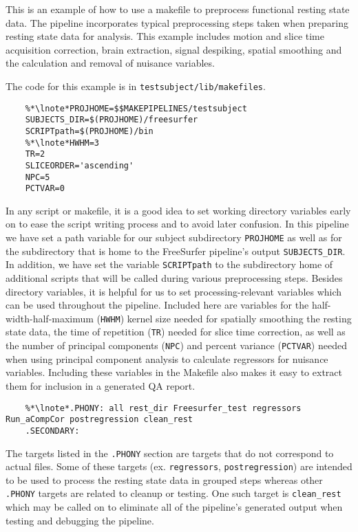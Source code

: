 \label{example:restingstate}
This is an example of how to use a makefile to preprocess functional resting state data. The pipeline incorporates typical preprocessing steps taken when preparing resting state data for analysis. This example includes motion and slice time acquisition correction, brain extraction, signal despiking, spatial smoothing and the calculation and removal of nuisance variables.

The code for this example is in \texttt{testsubject/lib/makefiles}. 

\setcounter{codehighlight}{0} %
\begin{lstlisting}
	%*\lnote*PROJHOME=$$MAKEPIPELINES/testsubject
	SUBJECTS_DIR=$(PROJHOME)/freesurfer
	SCRIPTpath=$(PROJHOME)/bin
	%*\lnote*HWHM=3
	TR=2
	SLICEORDER='ascending'
	NPC=5
	PCTVAR=0
\end{lstlisting}

 In any script or makefile, it is a good idea to set working directory variables early on to ease the script writing process and to avoid later confusion.  In this pipeline we have set a path variable for our subject subdirectory \texttt{PROJHOME} as well as for the subdirectory that is home to the FreeSurfer pipeline's output \texttt{SUBJECTS\_DIR}. In addition, we have set the variable \texttt{SCRIPTpath} to the subdirectory home of additional scripts that will be called during various preprocessing steps.  Besides directory variables, it is helpful for us to set processing-relevant variables which can be used throughout the pipeline. Included here are  variables for the half-width-half-maximum (\texttt{HWHM}) kernel size needed for spatially smoothing the resting state data, the time of repetition (\texttt{TR}) needed for slice time correction, as well as the number of principal components (\texttt{NPC}) and percent variance (\texttt{PCTVAR}) needed when using principal component analysis to calculate regressors for nuisance variables. Including these variables in the Makefile also makes it easy to extract them for inclusion in a generated QA report.

\begin{lstlisting}
	%*\lnote*.PHONY: all rest_dir Freesurfer_test regressors Run_aCompCor postregression clean_rest
	.SECONDARY:
\end{lstlisting}

 The targets listed in the \texttt{.PHONY} section are targets that do not correspond to actual files.   Some of these targets (ex. \texttt{regressors}, \texttt{postregression}) are intended to be used to process the resting state data in grouped steps whereas other \texttt{.PHONY} targets are related to cleanup or testing. One such target is \texttt{clean_rest} which may be called on to eliminate all of the pipeline's generated output when testing and debugging the pipeline.

